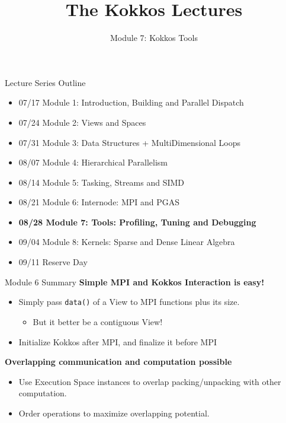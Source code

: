 
\def\sandid{SAND2020-9031 PE}

\title{The Kokkos Lectures}

\author{Module 7: Kokkos Tools}




\shortfalse
\mediumtrue
\fulltrue
\notoverviewtrue



\begin{frame}
	\titlepage
\end{frame}



\begin{frame}[fragile]{Lecture Series Outline}

\begin{itemize}
        \item 07/17 Module 1: Introduction, Building and Parallel Dispatch
        \item 07/24 Module 2: Views and Spaces
        \item 07/31 Module 3: Data Structures + MultiDimensional Loops
        \item 08/07 Module 4: Hierarchical Parallelism
        \item 08/14 Module 5: Tasking, Streams and SIMD
        \item 08/21 Module 6: Internode: MPI and PGAS
        \item \textbf{08/28 Module 7: Tools: Profiling, Tuning and Debugging}
        \item 09/04 Module 8: Kernels: Sparse and Dense Linear Algebra
        \item 09/11 Reserve Day
\end{itemize}

\end{frame}

\begin{frame}{Module 6 Summary}
\textbf{Simple MPI and Kokkos Interaction is easy!}
\begin{itemize}
  \item Simply pass \texttt{data()} of a View to MPI functions plus its size.
  \begin{itemize}
    \item But it better be a contiguous View!
  \end{itemize}
  \item Initialize Kokkos after MPI, and finalize it before MPI
\end{itemize}

\vspace{10pt}
\textbf{Overlapping communication and computation possible}
\begin{itemize}
  \item Use Execution Space instances to overlap packing/unpacking with other computation.
  \item Order operations to maximize overlapping potential. 
\end{itemize}
\end{frame}

